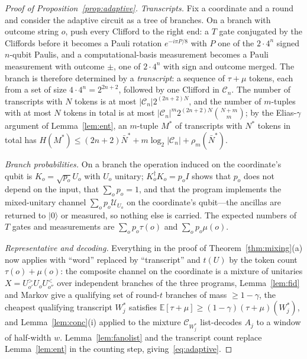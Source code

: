 \documentclass[aps,prx,twocolumn,superscriptaddress,nofootinbib,longbibliography]{revtex4-2}
\theoremstyle{plain}
\theoremstyle{definition}
\theoremstyle{remark}
\newcommand{\E}{\mathbb{E}}
\begin{document}
\begin{proof}[Proof of Proposition~\ref{prop:adaptive}]
\emph{Transcripts.} Fix a coordinate and a round and consider the adaptive circuit as a tree of branches. On a branch with outcome string $o$, push every Clifford to the right end: a $T$ gate conjugated by the Cliffords before it becomes a Pauli rotation $e^{-i\pi P/8}$ with $P$ one of the $2\cdot4^n$ signed $n$-qubit Paulis, and a computational-basis measurement becomes a Pauli measurement with outcome $\pm$, one of $2\cdot4^n$ with sign and outcome merged. The branch is therefore determined by a \emph{transcript}: a sequence of $\tau+\mu$ tokens, each from a set of size $4\cdot4^n=2^{2n+2}$, followed by one Clifford in $\mathcal C_n$. The number of transcripts with $N$ tokens is at most $|\mathcal C_n|2^{(2n+2)N}$, and the number of $m$-tuples with at most $N$ tokens in total is at most $|\mathcal C_n|^m2^{(2n+2)N}\binom{N+m}m$; by the Elias-$\gamma$ argument of Lemma~\ref{lem:ent}, an $m$-tuple $M^*$ of transcripts with $N^*$ tokens in total has $H(M^*)\le(2n+2)\bar N^*+m\log_2|\mathcal C_n|+\rho_m(\bar N^*)$.

\emph{Branch probabilities.} On a branch the operation induced on the coordinate's qubit is $K_o=\sqrt{p_o}U_o$ with $U_o$ unitary; $K_o^\dagger K_o=p_oI$ shows that $p_o$ does not depend on the input, that $\sum_op_o=1$, and that the program implements the mixed-unitary channel $\sum_op_o\mathcal U_{U_o}$ on the coordinate's qubit---the ancillas are returned to $|0\rangle$ or measured, so nothing else is carried. The expected numbers of $T$ gates and measurements are $\sum_op_o\tau(o)$ and $\sum_op_o\mu(o)$.

\emph{Representative and decoding.} Everything in the proof of Theorem~\ref{thm:mixing}(a) now applies with ``word'' replaced by ``transcript'' and $t(U)$ by the token count $\tau(o)+\mu(o)$: the composite channel on the coordinate is a mixture of unitaries $X=U^>_{o'}U_oU^<_{o''}$ over independent branches of the three programs, Lemma~\ref{lem:fid} and Markov give a qualifying set of round-$t$ branches of mass $\ge1-\gamma$, the cheapest qualifying transcript $W^*_j$ satisfies $\E[\tau+\mu]\ge(1-\gamma)(\tau+\mu)(W^*_j)$, and Lemma~\ref{lem:conc}(i) applied to the mixture $\mathcal C_{W^*_j}$ list-decodes $A_j$ to a window of half-width $w$. Lemma~\ref{lem:fanolist} and the transcript count replace Lemma~\ref{lem:ent} in the counting step, giving~\eqref{eq:adaptive}.
\end{proof}
\end{document}

